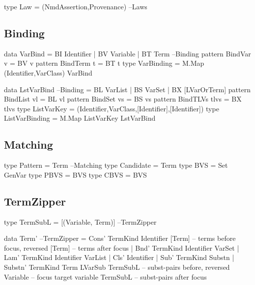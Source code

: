 \begin{code}
type Law = (NmdAssertion,Provenance)                                    --Laws
\end{code}

\subsection{Binding}

\begin{code}
data VarBind = BI Identifier | BV Variable | BT Term                 --Binding
pattern BindVar  v  =  BV v
pattern BindTerm t  =  BT t
type VarBinding = M.Map (Identifier,VarClass) VarBind
\end{code}

\begin{code}
data LstVarBind                                                      --Binding
 = BL  VarList
 | BS  VarSet
 | BX  [LVarOrTerm]
pattern BindList vl      =  BL vl
pattern BindSet  vs      =  BS vs
pattern BindTLVs tlvs    =  BX tlvs
type ListVarKey = (Identifier,VarClass,[Identifier],[Identifier])
type ListVarBinding = M.Map ListVarKey LstVarBind
\end{code}

\subsection{Matching}

\begin{code}
type Pattern = Term                                                 --Matching
type Candidate = Term
type BVS = Set GenVar
type PBVS = BVS
type CBVS = BVS
\end{code}

\subsection{TermZipper}

\begin{code}
type TermSubL = [(Variable, Term)]                              --TermZipper
\end{code}

\begin{code}
data Term'                                                        --TermZipper
  = Cons'   TermKind Identifier [Term] -- terms before focus, reversed
                                [Term] -- terms after focus
  | Bnd'   TermKind Identifier VarSet
  | Lam'    TermKind Identifier VarList
  | Cls'             Identifier
  | Sub'    TermKind Substn
  | Substn' TermKind Term LVarSub TermSubL  -- subst-pairs before, reversed
                                  Variable -- focus target variable
                                  TermSubL  -- subst-pairs after focus
\end{code}

